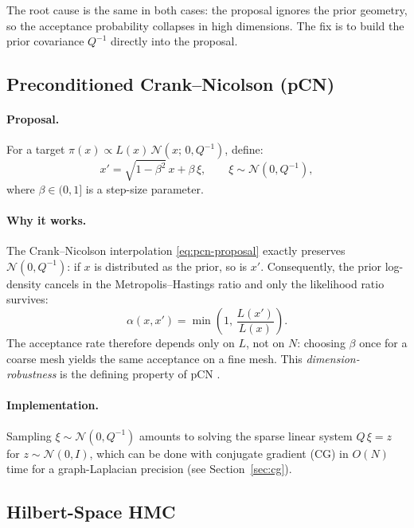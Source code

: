 \documentclass[11pt]{article}
\begin{document}
The root cause is the same in both cases: the proposal ignores the prior geometry,
so the acceptance probability collapses in high dimensions.  The fix is to build
the prior covariance $Q^{-1}$ directly into the proposal.

\subsection{Preconditioned Crank--Nicolson (pCN)}
\label{sec:pcn}

\paragraph{Proposal.}
For a target $\pi(x) \propto L(x)\,\mathcal{N}(x;\,0,Q^{-1})$, define:
\begin{equation}
  x' = \sqrt{1-\beta^2}\,x + \beta\,\xi, \qquad \xi \sim \mathcal{N}(0, Q^{-1}),
  \label{eq:pcn-proposal}
\end{equation}
where $\beta \in (0,1]$ is a step-size parameter.

\paragraph{Why it works.}
The Crank--Nicolson interpolation \eqref{eq:pcn-proposal} exactly preserves
$\mathcal{N}(0, Q^{-1})$: if $x$ is distributed as the prior, so is $x'$.
Consequently, the prior log-density cancels in the Metropolis--Hastings ratio and
only the likelihood ratio survives:
\begin{equation}
  \alpha(x, x') = \min\!\left(1,\, \frac{L(x')}{L(x)}\right).
  \label{eq:pcn-alpha}
\end{equation}
The acceptance rate therefore depends only on $L$, not on $N$: choosing $\beta$
once for a coarse mesh yields the same acceptance on a fine mesh.  This
\emph{dimension-robustness} is the defining property of pCN
\citep{cotter2013}.

\paragraph{Implementation.}
Sampling $\xi \sim \mathcal{N}(0, Q^{-1})$ amounts to solving the sparse linear
system $Q\,\xi = z$ for $z \sim \mathcal{N}(0,I)$, which can be done with
conjugate gradient (CG) in $O(N)$ time for a graph-Laplacian precision (see
Section~\ref{sec:cg}).

\subsection{Hilbert-Space HMC}
\label{sec:hilbert-hmc}
\end{document}
